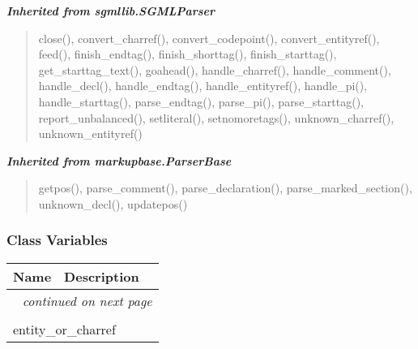 \large{\textbf{\textit{Inherited from sgmllib.SGMLParser}}}

\begin{quote}
close(), convert\_charref(), convert\_codepoint(), convert\_entityref(), feed(), finish\_endtag(), finish\_shorttag(), finish\_starttag(), get\_starttag\_text(), goahead(), handle\_charref(), handle\_comment(), handle\_decl(), handle\_endtag(), handle\_entityref(), handle\_pi(), handle\_starttag(), parse\_endtag(), parse\_pi(), parse\_starttag(), report\_unbalanced(), setliteral(), setnomoretags(), unknown\_charref(), unknown\_entityref()
\end{quote}

\large{\textbf{\textit{Inherited from markupbase.ParserBase}}}

\begin{quote}
getpos(), parse\_comment(), parse\_declaration(), parse\_marked\_section(), unknown\_decl(), updatepos()
\end{quote}


  \subsubsection{Class Variables}

    \vspace{-1cm}
\hspace{\varindent}\begin{longtable}{|p{\varnamewidth}|p{\vardescrwidth}|l}
\cline{1-2}
\cline{1-2} \centering \textbf{Name} & \centering \textbf{Description}& \\
\cline{1-2}
\endhead\cline{1-2}\multicolumn{3}{r}{\small\textit{continued on next page}}\\\endfoot\cline{1-2}
\endlastfoot\multicolumn{2}{|l|}{\textit{Inherited from sgmllib.SGMLParser}}\\
\multicolumn{2}{|p{\varwidth}|}{\raggedright entity\_or\_charref}\\
\cline{1-2}
\end{longtable}


